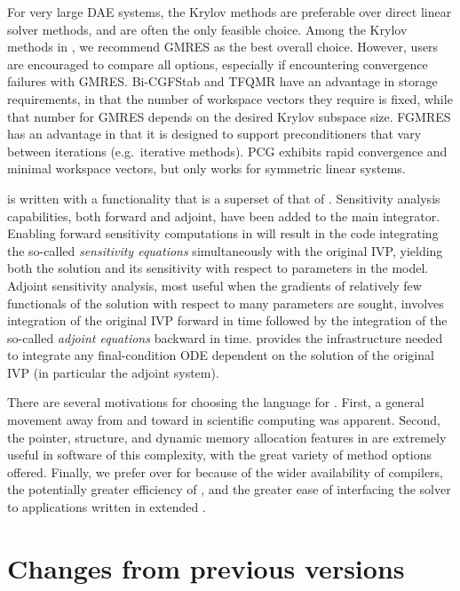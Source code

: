 For very large DAE systems, the Krylov methods are preferable over
direct linear solver methods, and are often the only feasible choice.
Among the Krylov methods in {\sundials}, we recommend GMRES as the
best overall choice.  However, users are encouraged to compare all
options, especially if encountering convergence failures with GMRES.
Bi-CGFStab and TFQMR have an advantage in storage requirements, in
that the number of workspace vectors they require is fixed, while that
number for GMRES depends on the desired Krylov subspace size.  FGMRES
has an advantage in that it is designed to support preconditioners
that vary between iterations (e.g.~iterative methods).  PCG exhibits
rapid convergence and minimal workspace vectors, but only works for
symmetric linear systems.

{\idas} is written with a functionality that is a superset of that
of {\ida}. Sensitivity analysis capabilities, both
forward and adjoint, have been added to the main integrator. Enabling
forward sensitivity computations in {\idas} will result in the
code integrating the so-called {\em sensitivity equations}
simultaneously with the original IVP, yielding both the solution and
its sensitivity with respect to parameters in the model. Adjoint
sensitivity analysis, most useful when the gradients of relatively few
functionals of the solution with respect to many parameters are
sought, involves integration of the original IVP forward in time
followed by the integration of the so-called {\em adjoint equations}
backward in time. {\idas} provides the infrastructure needed to
integrate any final-condition ODE dependent on the solution of the
original IVP (in particular the adjoint system).

There are several motivations for choosing the {\CC} language for {\idas}.
First, a general movement away from {\F} and toward {\CC} in scientific
computing was apparent.  Second, the pointer, structure, and dynamic
memory allocation features in {\CC} are extremely useful in software of
this complexity, with the great variety of method options offered.
Finally, we prefer {\CC} over {\CPP} for {\idas} because of the wider
availability of {\CC} compilers, the potentially greater efficiency of {\CC},
and the greater ease of interfacing the solver to applications written
in extended {\F}.


\section{Changes from previous versions}


